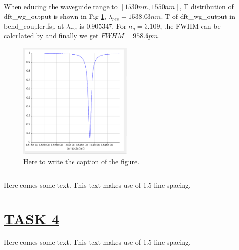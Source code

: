 \documentclass[fontsize=11pt]{scrartcl}
\begin{document}
\subsection{}
When educing the waveguide range to $[1530nm,1550nm]$, 
T distribution of dft\_wg\_output is shown in Fig \ref{fig3.2}, 
$\lambda_{res}=1538.03nm$. 
T of dft\_wg\_output in bend\_coupler.fsp at $\lambda_{res}$ is $0.905347$. 
For $n_g=3.109$, the FWHM can be calculated by 
and finally we get $FWHM=958.6pm$.
\begin{figure}[H]
    \centering
     \includegraphics[width=0.5\textwidth]{img/fig3.2.png}
     \caption{Here to write the caption of the figure.}
     \label{fig3.2}
\end{figure}  
\subsection{}
Here comes some text. This text makes use of 1.5 line spacing. 
\pagebreak
\section{\uline{TASK 4}}
Here comes some text. This text makes use of 1.5 line spacing. 
\end{document}

